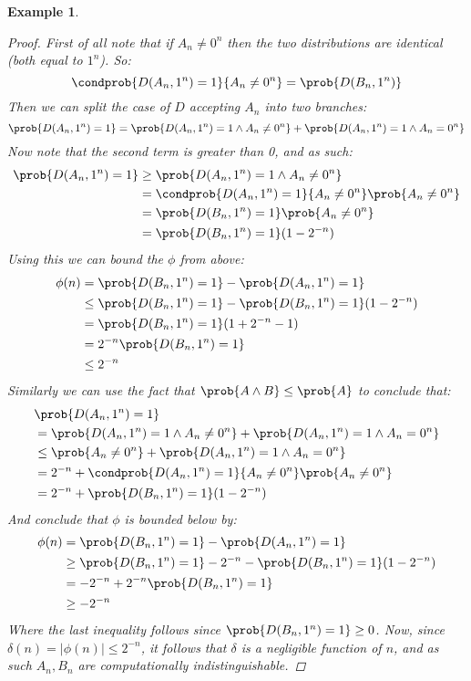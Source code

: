 \documentclass{article}
\newtheorem{example}{Example}
\begin{document}
\begin{example}
\begin{proof}
First of all note that if $A_n \neq 0^n$ then the two distributions are identical (both equal to $1^n$). So:
\[\condprob{D(A_n, 1^n) = 1}{ A_n \neq 0^n} = \prob{D(B_n, 1^n)} \]
Then we can split the case of $D$ accepting $A_n$ into two branches:
\[ \prob{D(A_n, 1^n) = 1} = \prob{D(A_n, 1^n) = 1 \land A_n \neq 0^n} + \prob{D(A_n, 1^n) = 1 \land A_n = 0^n}   \]
Now note that the second term is greater than 0, and as such:
\begin{align*}
    \prob{D(A_n, 1^n) = 1} &\geq \prob{D(A_n, 1^n) = 1 \land A_n \neq 0^n} \\
    &= \condprob{D(A_n, 1^n) = 1}{A_n \neq 0^n} \prob{A_n \neq 0^n} \\
    &= \prob{D(B_n, 1^n) = 1} \prob{A_n \neq 0^n} \\
    &= \prob{D(B_n, 1^n) = 1} (1 - 2^{-n}) \\
\end{align*}
Using this we can bound the $\phi$ from above: 
\begin{align*}
 \phi(n) &= \prob{D(B_n, 1^n) = 1} - \prob{D(A_n, 1^n) = 1} \\
 &\leq  \prob{D(B_n, 1^n) = 1} - \prob{D(B_n, 1^n) = 1} (1 - 2^{-n})  \\
 &= \prob{D(B_n, 1^n) = 1} (1 + 2^{-n} - 1) \\
 &= 2^{-n} \prob{D(B_n, 1^n) = 1} \\ 
 &\leq 2^{-n} \\
\end{align*}
Similarly we can use the fact that $\prob{A \land B} \leq \prob{A}$ to conclude that:
\begin{align*}
    &\prob{D(A_n, 1^n) = 1} \\
    &= \prob{D(A_n, 1^n) = 1 \land A_n \neq 0^n} + \prob{D(A_n, 1^n) = 1 \land A_n = 0^n} \\
    &\leq \prob{A_n \neq 0^n} + \prob{D(A_n, 1^n) = 1 \land A_n = 0^n} \\
    &= 2^{-n} + \condprob{D(A_n, 1^n) = 1}{A_n \neq 0^n} \prob{A_n \neq 0^n} \\
    &= 2^{-n} + \prob{D(B_n, 1^n) = 1} (1 - 2^{-n}) 
\end{align*}
And conclude that $\phi$ is bounded below by:
\begin{align*}
    \phi(n) &=  \prob{D(B_n, 1^n) = 1} - \prob{D(A_n, 1^n) = 1} \\
    &\geq  \prob{D(B_n, 1^n) = 1} - 2^{-n} - \prob{D(B_n, 1^n) = 1} (1 - 2^{-n}) \\
    &=  - 2 ^ {-n} + 2^{-n} \prob{D(B_n, 1^n) = 1} \\ 
    &\geq - 2^{-n} 
\end{align*}
Where the last inequality follows since $\prob{D(B_n, 1^n) = 1} \geq 0$.
Now, since $\delta(n) = |\phi(n)| \leq  2 ^ {-n} $, it follows that $\delta$ is a negligible function of $n$, and as such $A_n, B_n$ are computationally indistinguishable. 

\end{proof}
\end{example}
\end{document}
